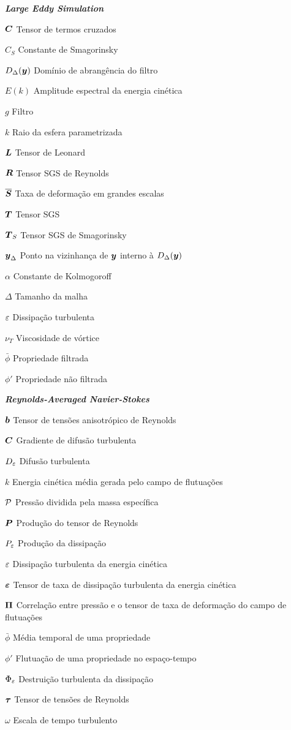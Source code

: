 \begin{simbolos}
    \item[\textbf{\textit{Large Eddy Simulation}}]
    \item[$\boldsymbol{C}$] Tensor de termos cruzados
    \item[$C_S$] Constante de Smagorinsky
    \item[$D_\Delta(\boldsymbol{y})$] Domínio de abrangência do filtro
    \item[$E(k)$] Amplitude espectral da energia cinética
    \item[$g$] Filtro
    \item[$k$] Raio da esfera parametrizada
    \item[$\boldsymbol{L}$] Tensor de Leonard
    \item[$\boldsymbol{R}$] Tensor SGS de Reynolds
    \item[$\overline{\boldsymbol{S}}$] Taxa de deformação em grandes escalas
    \item[$\boldsymbol{T}$] Tensor SGS
    \item[$\boldsymbol{T}_S$] Tensor SGS de Smagorinsky
    \item[$\boldsymbol{y}_\Delta$] Ponto na vizinhança de $\boldsymbol{y}$ interno à $D_\Delta(\boldsymbol{y})$
    \item[$\alpha$] Constante de Kolmogoroff
    \item[$\Delta$] Tamanho da malha
    \item[$\varepsilon$] Dissipação turbulenta
    \item[$\nu_T$] Viscosidade de vórtice
    \item[$\bar{\phi}$] Propriedade filtrada
    \item[$\phi'$] Propriedade não filtrada

    \item[\textbf{\textit{Reynolds-Averaged Navier-Stokes}}]
    \item[$\boldsymbol{b}$] Tensor de tensões anisotrópico de Reynolds
    \item[$\boldsymbol{C}$] Gradiente de difusão turbulenta
    \item[$D_\varepsilon$] Difusão turbulenta
    \item[$k$] Energia cinética média gerada pelo campo de flutuações
    \item[$\mathcal{P}$] Pressão dividida pela massa específica
    \item[$\boldsymbol{P}$] Produção do tensor de Reynolds
    \item[$P_\varepsilon$] Produção da dissipação
    \item[$\varepsilon$] Dissipação turbulenta da energia cinética
    \item[$\boldsymbol{\varepsilon}$] Tensor de taxa de dissipação turbulenta da energia cinética
    \item[$\boldsymbol{\Pi}$] Correlação entre pressão e o tensor de taxa de deformação do campo de flutuações
    \item[$\bar{\phi}$] Média temporal de uma propriedade
    \item[$\phi'$] Flutuação de uma propriedade no espaço-tempo
    \item[$\Phi_\varepsilon$] Destruição turbulenta da dissipação
    \item[$\boldsymbol{\tau}$] Tensor de tensões de Reynolds
    \item[$\omega$] Escala de tempo turbulento
\end{simbolos}